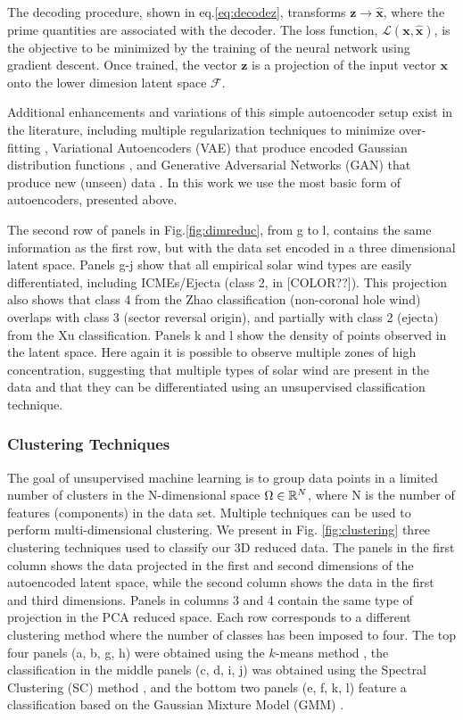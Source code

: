 The decoding procedure, shown in eq.\eqref{eq:decodez}, transforms $\boldsymbol{z}\rightarrow\boldsymbol{\hat{x}}$, where the prime quantities are associated with the decoder. The loss function, $\mathcal{L}(\boldsymbol{x}, \boldsymbol{\hat{x}})$, is the objective to be minimized by the training of the neural network using gradient descent. Once trained, the vector $\boldsymbol{z}$ is a projection of the input vector $\boldsymbol{x}$ onto the lower dimesion latent space $\boldsymbol{\mathcal{F}}$.

Additional enhancements and variations of this simple autoencoder setup exist in the literature, including multiple regularization techniques to minimize over-fitting \citep{[REF??]}, Variational Autoencoders (VAE) that produce encoded Gaussian distribution functions \citep{[REF??]}, and Generative Adversarial Networks (GAN) that produce new (unseen) data \citep{[REF??]}. In this work we use the most basic form of autoencoders, presented above.

The second row of panels in Fig.\ref{fig:dimreduc}, from g to l, contains the same information as the first row, but with the data set encoded in a three dimensional latent space. Panels g-j show that all empirical solar wind types are easily differentiated, including ICMEs/Ejecta (class 2, in [COLOR??]). This projection also shows that class 4 from the Zhao classification (non-coronal hole wind) overlaps with class 3 (sector reversal origin), and partially with class 2 (ejecta) from the Xu classification. Panels k and l show the density of points observed in the latent space. Here again it is possible to observe multiple zones of high concentration, suggesting that multiple types of solar wind are present in the data and that they can be differentiated using an unsupervised classification technique.

\subsubsection{Clustering Techniques}
\label{sec:clustering}
The goal of unsupervised machine learning is to group data points in a limited number of clusters in the N-dimensional space $\Omega\in\Bbb R^N$, where N is the number of features (components) in the data set. Multiple techniques can be used to perform multi-dimensional clustering. We present in Fig. \ref{fig:clustering} three clustering techniques used to classify our 3D reduced data. The panels in the first column shows the data projected in the first and second dimensions of the autoencoded latent space, while the second column shows the data in the first and third dimensions. Panels in columns 3 and 4 contain the same type of projection in the PCA reduced space. Each row corresponds to a different clustering method where the number of classes has been imposed to four. The top four panels (a, b, g, h) were obtained using the $k$-means method \citep{[REF??]}, the classification in the middle panels (c, d, i, j) was obtained using the Spectral Clustering (SC) method \citep{[REF??]}, and the bottom two panels (e, f, k, l) feature a classification based on the Gaussian Mixture Model (GMM) \citep{[REF??]}.

